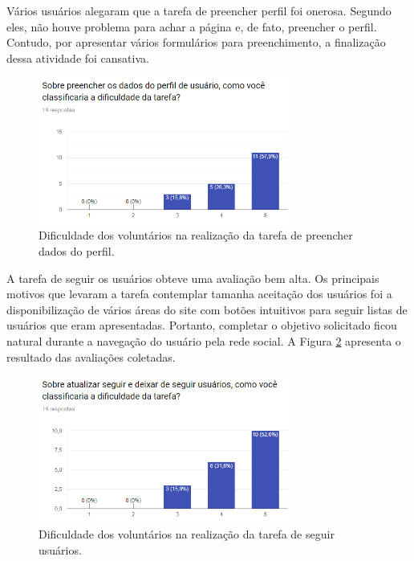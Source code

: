 Vários usuários alegaram que a tarefa de preencher perfil foi onerosa. Segundo eles, não houve problema para achar a página e, de fato, preencher o perfil. Contudo, por apresentar vários formulários para preenchimento, a finalização dessa atividade foi cansativa.

\begin{figure}[H]
    \caption{Dificuldade dos voluntários na realização da tarefa de preencher dados do perfil.}
       	\begin{center}
            \includegraphics[width=0.75\textwidth]{figuras/avaliacao/pdv-2.png}
        \end{center}
    \label{avalGrafTUPreencherPerfil}
\end{figure} 


A tarefa de seguir os usuários obteve uma avaliação bem alta. Os principais motivos que levaram a tarefa contemplar tamanha aceitação dos usuários foi a disponibilização de vários áreas do site com botões intuitivos para seguir listas de usuários que eram apresentadas. Portanto, completar o objetivo solicitado ficou natural durante a navegação do usuário pela rede social. A Figura \ref{avalGrafTUSeguir} apresenta o resultado das avaliações coletadas.

\begin{figure}[h]
    \caption{Dificuldade dos voluntários na realização da tarefa de seguir usuários.}
       	\begin{center}
            \includegraphics[width=0.75\textwidth]{figuras/avaliacao/pdv-3.png}
        \end{center}
    \label{avalGrafTUSeguir}
\end{figure} 


